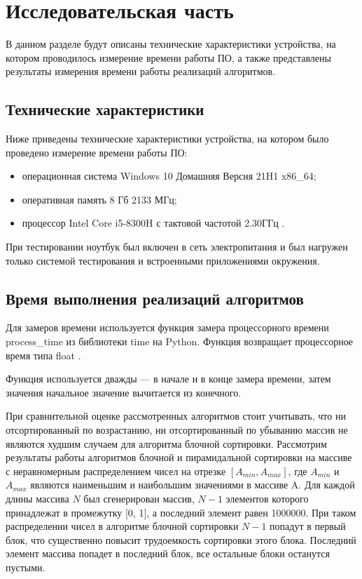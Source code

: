 \chapter{Исследовательская часть}

В данном разделе будут описаны технические характеристики устройства, на котором проводилось измерение времени работы ПО, а также представлены результаты измерения времени работы реализаций алгоритмов.

\section{Технические характеристики}

Ниже приведены технические характеристики устройства, на котором было проведено измерение времени работы ПО:

\begin{itemize}
    \item операционная система Windows 10 Домашняя Версия 21H1 \cite{windows} x86\_64;
    \item оперативная память 8 Гб 2133 МГц;
    \item процессор Intel Core i5-8300H с тактовой частотой 2.30ГГц \cite{intel}.
\end{itemize}

При тестировании ноутбук был включен в сеть электропитания и был нагружен только системой тестирования и встроенными приложениями окружения.

\section{Время выполнения реализаций алгоритмов}

Для замеров времени используется функция замера процессорного времени process\_time из библиотеки time на Python. Функция возвращает процессорное время типа float \cite{time}.

Функция используется дважды --- в начале и в конце замера времени, затем значения начальное значение вычитается из конечного.

При сравнительной оценке рассмотренных алгоритмов стоит учитывать, что ни отсортированный по возрастанию, ни отсортированный по убыванию массив не являются худшим случаем для алгоритма блочной сортировки. Рассмотрим результаты работы алгоритмов блочной и пирамидальной сортировки на массиве с неравномерным распределением чисел на отрезке $[A_{min}, A_{max}]$, где  $A_{min}$ и  $A_{max}$ являются наименьшим и наибольшим значениями в массиве A. Для каждой длины массива $N$ был сгенерирован массив, $N-1$ элементов которого принадлежат в промежутку [0, 1], а последний элемент равен 1000000. При таком распределении чисел в алгоритме блочной сортировки $N-1$ попадут в первый блок, что существенно повысит трудоемкость сортировки этого блока. Последний элемент массива попадет в последний блок, все остальные блоки останутся пустыми.

